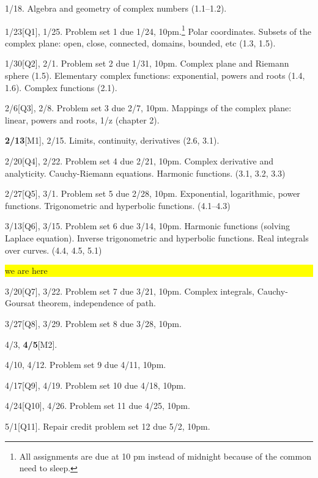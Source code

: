 \documentclass[oneside,11pt]{amsart}
\begin{document}
\begin{enumerate}[\bf{}{[}week 1{]}]
	\item 1/18. Algebra and geometry of complex numbers (1.1--1.2).
	\item 1/23[Q1], 1/25. Problem set 1 due 1/24, 10pm.\footnote{All assignments are due at 10 pm instead of midnight because of the common need to sleep.}
		Polar coordinates. Subsets of the complex plane: open, close, connected, domains, bounded, etc (1.3, 1.5).
	\item 1/30[Q2], 2/1. Problem set 2 due 1/31, 10pm.
		Complex plane and Riemann sphere (1.5).
		Elementary complex functions: exponential, powers and roots (1.4, 1.6).
		Complex functions (2.1).
	\item 2/6[Q3], 2/8. Problem set 3 due 2/7, 10pm.
		Mappings of the complex plane: linear, powers and roots, 1/z (chapter 2).
	\item \textbf{2/13}[M1], 2/15.
		Limits, continuity, derivatives
		(2.6, 3.1).
	\item 2/20[Q4], 2/22. Problem set 4 due 2/21, 10pm.
		Complex derivative and analyticity. Cauchy-Riemann equations.  Harmonic functions.
		(3.1, 3.2, 3.3)
	\item 2/27[Q5], 3/1. Problem set 5 due 2/28, 10pm.
		Exponential, logarithmic, power functions.
		Trigonometric and hyperbolic functions. 
		(4.1--4.3)
	\item 3/13[Q6], 3/15. Problem set 6 due 3/14, 10pm.
		Harmonic functions (solving Laplace equation). 
		Inverse trigonometric and hyperbolic functions. 
		Real integrals over curves.
		(4.4, 4.5, 5.1)

		\colorbox{yellow}{\parbox{.7\textwidth}{we are here}}
	\item 3/20[Q7], 3/22. Problem set 7 due 3/21, 10pm.
		Complex integrals, Cauchy-Goursat theorem, independence of path.

	\item 3/27[Q8], 3/29. Problem set 8 due 3/28, 10pm.
	\item 4/3, \textbf{4/5}[M2].
	\item 4/10, 4/12. Problem set 9 due 4/11, 10pm.
	\item 4/17[Q9], 4/19. Problem set 10 due 4/18, 10pm.
	\item 4/24[Q10], 4/26. Problem set 11 due 4/25, 10pm.
	\item 5/1[Q11]. Repair credit problem set 12 due 5/2, 10pm.
\end{enumerate}

\medskip
\end{document}
